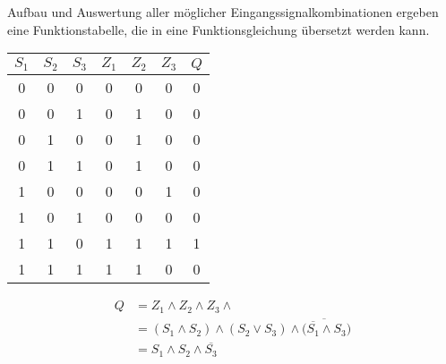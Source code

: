\documentclass[
a4paper,     %
 headsepline, %
11pt         %
]{scrartcl}  %
\begin{document}
Aufbau und Auswertung aller möglicher Eingangssignalkombinationen ergeben eine Funktionstabelle, die in eine Funktionsgleichung übersetzt werden kann.
\begin{center}
\begin{tabular}{c | c | c || c | c | c || c}
$S_1$ & $S_2$ & $S_3$ & $Z_1$  & $Z_2$ & $Z_3$ & $Q$\\ \hline
0 & 0 & 0 & 0 & 0 & 0 & 0 \\ \hline
0 & 0 & 1 & 0 & 1 & 0 & 0 \\ \hline
0 & 1 & 0 & 0 & 1 & 0 & 0 \\ \hline
0 & 1 & 1 & 0 & 1 & 0 & 0 \\ \hline
1 & 0 & 0 & 0 & 0 & 1 & 0 \\ \hline
1 & 0 & 1 & 0 & 0 & 0 & 0 \\ \hline
1 & 1 & 0 & 1 & 1 & 1 & 1 \\ \hline
1 & 1 & 1 & 1 & 1 & 0 & 0 \\ \hline
\end{tabular}
\end{center}
\begin{align}
Q &= Z_1 \land Z_2 \land Z_3 \land \nonumber \\ 
  &= (S_1 \land S_2) \land (S_2 \lor S_3) \land \overline{(\overline{S_1} \land S_3}) \nonumber \\ 
  &= S_1 \land S_2 \land \overline{S_3} \nonumber
\end{align}



% 

% 
\end{document}
